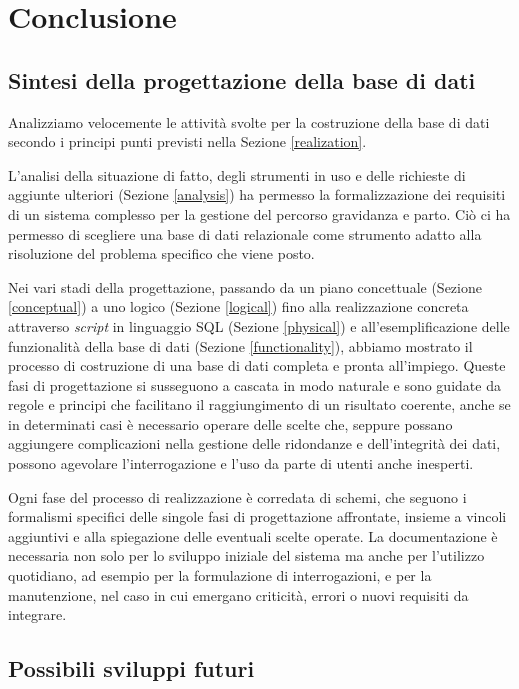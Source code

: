 \chapter{Conclusione}

\section{Sintesi della progettazione della base di dati}

Analizziamo velocemente le attività svolte per la costruzione della base di dati secondo i principi punti previsti nella Sezione \ref{realization}.

L'analisi della situazione di fatto, degli strumenti in uso e delle richieste di aggiunte ulteriori (Sezione \ref{analysis}) ha permesso la formalizzazione dei requisiti di un sistema complesso per la gestione del percorso gravidanza e parto.
Ciò ci ha permesso di scegliere una base di dati relazionale come strumento adatto alla risoluzione del problema specifico che viene posto.

Nei vari stadi della progettazione, passando da un piano concettuale (Sezione \ref{conceptual}) a uno logico (Sezione \ref{logical}) fino alla realizzazione concreta attraverso \emph{script} in linguaggio SQL (Sezione \ref{physical}) e all'esemplificazione delle funzionalità della base di dati (Sezione \ref{functionality}), abbiamo mostrato il processo di costruzione di una base di dati completa e pronta all'impiego.
Queste fasi di progettazione si susseguono a cascata in modo naturale e sono guidate da regole e principi che facilitano il raggiungimento di un risultato coerente, anche se in determinati casi è necessario operare delle scelte che, seppure possano aggiungere complicazioni nella gestione delle ridondanze e dell'integrità dei dati, possono agevolare l'interrogazione e l'uso da parte di utenti anche inesperti.

Ogni fase del processo di realizzazione è corredata di schemi, che seguono i formalismi specifici delle singole fasi di progettazione affrontate, insieme a vincoli aggiuntivi e alla spiegazione delle eventuali scelte operate.
La documentazione è necessaria non solo per lo sviluppo iniziale del sistema ma anche per l'utilizzo quotidiano, ad esempio per la formulazione di interrogazioni, e per la manutenzione, nel caso in cui emergano criticità, errori o nuovi requisiti da integrare.

\section{Possibili sviluppi futuri}

